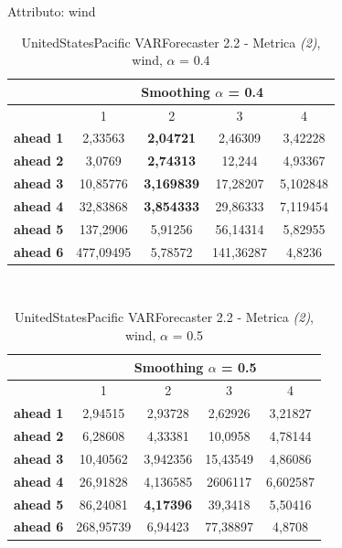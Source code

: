 \documentclass[12pt,a4paper,oneside,openright]{book}
\begin{document}
\newpage

Attributo: wind \\ 

\begin{table}[H]
\centering
\begin{tabular}{|c|c|c|c|c|}
\hline
 & \multicolumn{4}{|c|}{Smoothing $\alpha$ = 0.4} \\
\hline
& 1 & 2 & 3 & 4 \\
\hline
\textbf{ahead 1} & 2,33563 & \textbf{2,04721} & 2,46309 & 3,42228\\
\hline
\textbf{ahead 2} & 3,0769 & \textbf{2,74313} & 12,244 & 4,93367\\ 
\hline
\textbf{ahead 3} & 10,85776 & \textbf{3,169839} & 17,28207 & 5,102848\\
\hline
\textbf{ahead 4} & 32,83868 & \textbf{3,854333} & 29,86333 & 7,119454\\ 
\hline
\textbf{ahead 5} & 137,2906 & 5,91256 & 56,14314 & 5,82955\\
\hline
\textbf{ahead 6} & 477,09495 & 5,78572 & 141,36287 & 4,8236\\ 
\hline
\end{tabular} \\
\caption{UnitedStatesPacific VARForecaster 2.2 - Metrica \textit{(2)}, wind, $\alpha$ = 0.4}
\end{table}

\medskip

\begin{table}[H]
\centering
\begin{tabular}{|c|c|c|c|c|}
\hline
 & \multicolumn{4}{|c|}{Smoothing $\alpha$ = 0.5} \\
\hline
& 1 & 2 & 3 & 4 \\
\hline
\textbf{ahead 1} & 2,94515 & 2,93728 & 2,62926 & 3,21827\\
\hline
\textbf{ahead 2} & 6,28608 & 4,33381 & 10,0958 & 4,78144\\ 
\hline
\textbf{ahead 3} & 10,40562 & 3,942356 & 15,43549 & 4,86086\\
\hline
\textbf{ahead 4} & 26,91828 & 4,136585 & 2606117 & 6,602587\\ 
\hline
\textbf{ahead 5} & 86,24081 & \textbf{4,17396} & 39,3418 & 5,50416\\
\hline
\textbf{ahead 6} & 268,95739 & 6,94423 & 77,38897 & 4,8708\\ 
\hline
\end{tabular} \\
\caption{UnitedStatesPacific VARForecaster 2.2 - Metrica \textit{(2)}, wind, $\alpha$ = 0.5}
\end{table}
\end{document}
